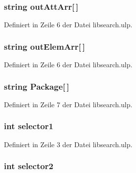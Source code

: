 \subsubsection[{out\+Att\+Arr}]{\setlength{\rightskip}{0pt plus 5cm}string out\+Att\+Arr\mbox{[}$\,$\mbox{]}}\label{libsearch_8ulp_a801e8dfc827f7961b6012c0100f77ab4}


Definiert in Zeile 6 der Datei libsearch.\+ulp.

\hypertarget{libsearch_8ulp_abd552ace971c34ee4d05fc524378dc32}{}
\subsubsection[{out\+Elem\+Arr}]{\setlength{\rightskip}{0pt plus 5cm}string out\+Elem\+Arr\mbox{[}$\,$\mbox{]}}\label{libsearch_8ulp_abd552ace971c34ee4d05fc524378dc32}


Definiert in Zeile 6 der Datei libsearch.\+ulp.

\hypertarget{libsearch_8ulp_a36b57fe679881487796855a589fbfb85}{}
\subsubsection[{Package}]{\setlength{\rightskip}{0pt plus 5cm}string Package\mbox{[}$\,$\mbox{]}}\label{libsearch_8ulp_a36b57fe679881487796855a589fbfb85}


Definiert in Zeile 7 der Datei libsearch.\+ulp.

\hypertarget{libsearch_8ulp_a2f0524c519c9a079ebbe76797552cfff}{}
\subsubsection[{selector1}]{\setlength{\rightskip}{0pt plus 5cm}int selector1}\label{libsearch_8ulp_a2f0524c519c9a079ebbe76797552cfff}


Definiert in Zeile 3 der Datei libsearch.\+ulp.

\hypertarget{libsearch_8ulp_acb22ea06df7a98062b750ecca56f1628}{}
\subsubsection[{selector2}]{\setlength{\rightskip}{0pt plus 5cm}int selector2}\label{libsearch_8ulp_acb22ea06df7a98062b750ecca56f1628}


